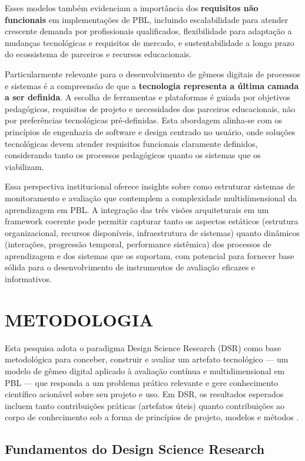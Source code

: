 \documentclass[12pt,a4paper]{article}
\begin{document}
Esses modelos também evidenciam a importância dos \textbf{requisitos não
  funcionais} em implementações de PBL, incluindo escalabilidade para atender
crescente demanda por profissionais qualificados, flexibilidade para adaptação
a mudanças tecnológicas e requisitos de mercado, e sustentabilidade a longo
prazo do ecossistema de parceiros e recursos educacionais.

Particularmente relevante para o desenvolvimento de gêmeos digitais de
processos e sistemas é a compreensão de que a \textbf{tecnologia representa
  a última camada a ser definida}. A escolha de ferramentas e plataformas é
 guiada por objetivos pedagógicos, requisitos de projeto e necessidades dos
 parceiros educacionais, não por preferências tecnológicas pré-definidas. Esta abordagem
alinha-se com os princípios de engenharia de software e design centrado no
usuário, onde soluções tecnológicas devem atender requisitos funcionais
claramente definidos, considerando tanto os processos pedagógicos quanto os
sistemas que os viabilizam.

Essa perspectiva institucional oferece insights sobre como
estruturar sistemas de monitoramento e avaliação que contemplem a complexidade
multidimensional da aprendizagem em PBL. A integração das três visões
arquiteturais em um framework coerente pode permitir capturar tanto os aspectos
estáticos (estrutura organizacional, recursos disponíveis, infraestrutura de
sistemas) quanto dinâmicos (interações, progressão temporal, performance
sistêmica) dos processos de aprendizagem e dos sistemas que os suportam, com
potencial para fornecer base sólida para o desenvolvimento de instrumentos de
avaliação eficazes e informativos.

\section{METODOLOGIA}

Esta pesquisa adota o paradigma Design Science Research (DSR) como base
metodológica para conceber, construir e avaliar um artefato tecnológico — um
modelo de gêmeo digital aplicado à avaliação contínua e multidimensional em
PBL — que responda a um problema prático relevante e gere conhecimento
científico acionável sobre seu projeto e uso. Em DSR, os resultados esperados
incluem tanto contribuições práticas (artefatos úteis) quanto contribuições ao
corpo de conhecimento sob a forma de princípios de projeto, modelos e métodos
\cite{march1995design, hevner2004design}.

\subsection{Fundamentos do Design Science Research}
\end{document}
